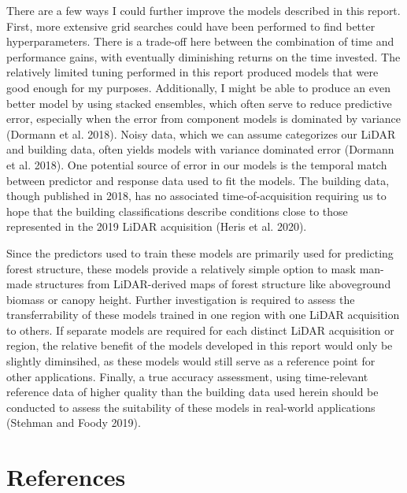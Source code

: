 \documentclass[]{elsarticle} %
\begin{document}
There are a few ways I could further improve the models described in this
report.
First, more extensive grid searches could have been performed to find better
hyperparameters.
There is a trade-off here between the combination of time
and performance gains, with eventually diminishing returns on the time invested.
The relatively limited tuning performed in this report produced models that were
good enough for my purposes.
Additionally, I might be able to produce an even better model by using
stacked ensembles, which often serve to reduce predictive error, especially
when the error from component models is dominated by variance (Dormann et al. 2018).
Noisy data, which we can assume categorizes our LiDAR and building data, often
yields models with variance dominated error (Dormann et al. 2018).
One potential source of error in our models is the temporal match between
predictor and response data used to fit the models.
The building data, though published in 2018, has no associated
time-of-acquisition requiring us to hope that the building classifications
describe conditions close to those represented in the 2019 LiDAR acquisition
(Heris et al. 2020).

Since the predictors used to train these models are primarily used for
predicting forest structure, these models provide a relatively simple option
to mask man-made structures from LiDAR-derived maps of forest structure like
aboveground biomass or canopy height.
Further investigation is required to assess the transferrability of these models
trained in one region with one LiDAR acquisition to others.
If separate models are required for each distinct LiDAR acquisition or region,
the relative benefit of the models developed in this report would only be
slightly diminsihed, as these models would still serve as a reference point for
other applications.
Finally, a true accuracy assessment, using time-relevant reference data of
higher quality than the building data used herein should be conducted to assess
the suitability of these models in real-world applications (Stehman and Foody 2019).

\newpage{}

\hypertarget{references}{%
\section*{References}\label{references}}
\end{document}
